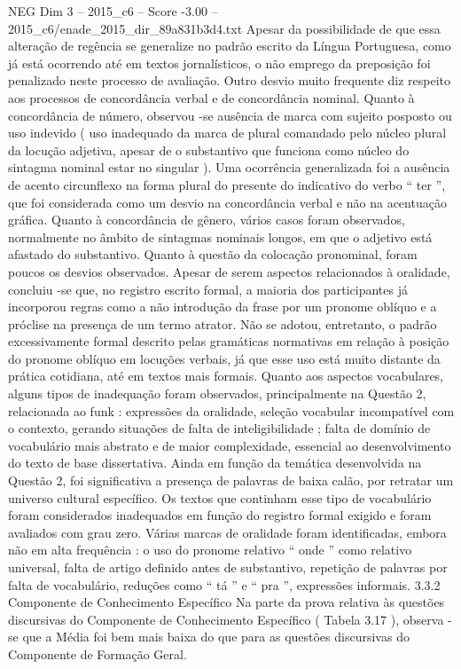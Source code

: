 \begin{textsample}{NEG Dim 3 – 2015\_c6 – Score -3.00 – 2015\_c6/enade\_2015\_dir\_89a831b3d4.txt}
Apesar da possibilidade de que essa alteração de regência se generalize no padrão escrito da Língua Portuguesa, como já está ocorrendo até em textos jornalísticos, o não emprego da preposição foi penalizado neste processo de avaliação.
Outro desvio muito frequente diz respeito aos processos de concordância verbal e de concordância nominal.
Quanto à concordância de número, observou -se ausência de marca com sujeito posposto ou uso indevido ( uso inadequado da marca de plural comandado pelo núcleo plural da locução adjetiva, apesar de o substantivo que funciona como núcleo do sintagma nominal estar no singular ).
Uma ocorrência generalizada foi a ausência de acento circunflexo na forma plural do presente do indicativo do verbo “ ter ”, que foi considerada como um desvio na concordância verbal e não na acentuação gráfica.
Quanto à concordância de gênero, vários casos foram observados, normalmente no âmbito de sintagmas nominais longos, em que o adjetivo está afastado do substantivo.
Quanto à questão da colocação pronominal, foram poucos os desvios observados.
Apesar de serem aspectos relacionados à oralidade, concluiu -se que, no registro escrito formal, a maioria dos participantes já incorporou regras como a não introdução da frase por um pronome oblíquo e a próclise na presença de um termo atrator.
Não se adotou, entretanto, o padrão excessivamente formal descrito pelas gramáticas normativas em relação à posição do pronome oblíquo em locuções verbais, já que esse uso está muito distante da prática cotidiana, até em textos mais formais.
Quanto aos aspectos vocabulares, alguns tipos de inadequação foram observados, principalmente na Questão 2, relacionada ao funk : expressões da oralidade, seleção vocabular incompatível com o contexto, gerando situações de falta de inteligibilidade ; falta de domínio de vocabulário mais abstrato e de maior complexidade, essencial ao desenvolvimento do texto de base dissertativa.
Ainda em função da temática desenvolvida na Questão 2, foi significativa a presença de palavras de baixa calão, por retratar um universo cultural específico.
Os textos que continham esse tipo de vocabulário foram considerados inadequados em função do registro formal exigido e foram avaliados com grau zero.
Várias marcas de oralidade foram identificadas, embora não em alta frequência : o uso do pronome relativo “ onde ” como relativo universal, falta de artigo definido antes de substantivo, repetição de palavras por falta de vocabulário, reduções como “ tá ” e “ pra ”, expressões informais. 3.3.2 Componente de Conhecimento Específico Na parte da prova relativa às questões discursivas do Componente de Conhecimento Específico ( Tabela 3.17 ), observa -se que a Média foi bem mais baixa do que para as questões discursivas do Componente de Formação Geral.

\end{textsample}
